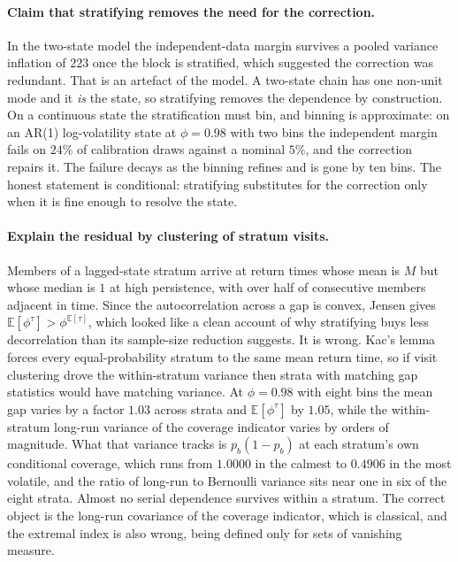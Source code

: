 \documentclass[11pt]{article}
\theoremstyle{definition}
\theoremstyle{remark}
\newcommand{\E}{\mathbb{E}}
\begin{document}
\paragraph{Claim that stratifying removes the need for the correction.} In the two-state model
the independent-data margin survives a pooled variance inflation of $223$ once the block is
stratified, which suggested the correction was redundant. That is an artefact of the model. A
two-state chain has one non-unit mode and it \emph{is} the state, so stratifying removes the
dependence by construction. On a continuous state the stratification must bin, and binning is
approximate: on an AR(1) log-volatility state at $\phi=0.98$ with two bins the independent margin
fails on $24\%$ of calibration draws against a nominal $5\%$, and the correction repairs it. The
failure decays as the binning refines and is gone by ten bins. The honest statement is conditional:
stratifying substitutes for the correction only when it is fine enough to resolve the state.

\paragraph{Explain the residual by clustering of stratum visits.} Members of a lagged-state
stratum arrive at return times whose mean is $M$ but whose median is $1$ at high persistence, with
over half of consecutive members adjacent in time. Since the autocorrelation across a gap is convex,
Jensen gives $\E[\phi^\tau] > \phi^{\E[\tau]}$, which looked like a clean account of why stratifying
buys less decorrelation than its sample-size reduction suggests. It is wrong. Kac's lemma forces
every equal-probability stratum to the same mean return time, so if visit clustering drove the
within-stratum variance then strata with matching gap statistics would have matching variance.
At $\phi=0.98$ with eight bins the mean gap varies by a factor $1.03$ across strata and
$\E[\phi^\tau]$ by $1.05$, while the within-stratum long-run variance of the coverage indicator
varies by orders of magnitude. What that variance tracks is $p_b(1-p_b)$ at each stratum's own
conditional coverage, which runs from $1.0000$ in the calmest to $0.4906$ in the most volatile, and
the ratio of long-run to Bernoulli variance sits near one in six of the eight strata. Almost no
serial dependence survives within a stratum. The correct object is the long-run covariance of the
coverage indicator, which is classical, and the extremal index is also wrong, being defined only for
sets of vanishing measure.
\end{document}
